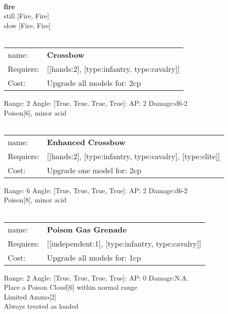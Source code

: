 \ \\ {\bf fire } \\
still [Fire, Fire] \\
slow [Fire, Fire] \\

\ \\
\begin{tabular}{ll}
name: & {\bf Crossbow } \\
Requiers: & [[hands:2], [type:infantry, type:cavalry]] \\
Cost: & Upgrade all models for: 2cp \\
\end{tabular}



Range: 2  Angle: [True, True, True, True]: AP: 2 Damage:d6-2 \\
Poison[6], minor acid\\ 








\ \\
\begin{tabular}{ll}
name: & {\bf Enhanced Crossbow } \\
Requiers: & [[hands:2], [type:infantry, type:cavalry], [type:elite]] \\
Cost: & Upgrade one model for: 2cp \\
\end{tabular}



Range: 6  Angle: [True, True, True, True]: AP: 2 Damage:d6-2 \\
Poison[8], minor acid\\ 








\ \\
\begin{tabular}{ll}
name: & {\bf Poison Gas Grenade } \\
Requiers: & [[independent:1], [type:infantry, type:cavalry]] \\
Cost: & Upgrade all models for: 1cp \\
\end{tabular}



Range: 2  Angle: [True, True, True, True]: AP: 0 Damage:N.A. \\
Place a Poison Cloud[6] within normal range\\ 
Limited Ammo[2]\\ 
Always treated as loaded\\ 







